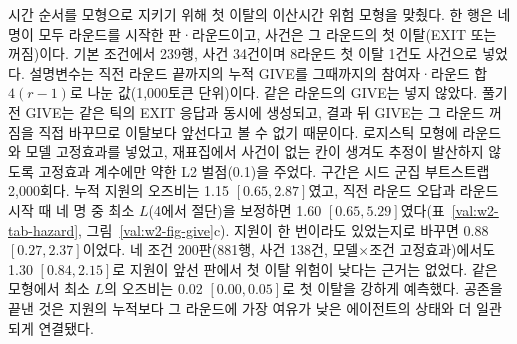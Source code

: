 \begin{table}[!htbp]
\centering
\small
\caption{지원량 측정을 바꿨을 때 $C$와의 모델 안 상관. 기본 조건은 모델 평균을, 네 조건 합산은 모델$\times$조건 칸 평균을 뺀 뒤의 상관이다. 괄호는 같은 시드의 판을 한 묶음으로 다시 뽑는 시드 군집 부트스트랩 10,000회의 95\% 구간이고 $p$는 모델(칸) 안에서 $C$를 섞는 순열 검정 20,000회의 양측 값이다. 지원량은 모두 해당 구간의 참여자·라운드 합으로 나눴다. 첫 이탈 라운드 이전 라운드만 세는 측정은 1라운드 이탈 판에서 분모가 0이라 정의되지 않는다.}
\label{val:w2-tab-give}
\end{table}

시간 순서를 모형으로 지키기 위해 첫 이탈의 이산시간 위험 모형을 맞췄다. 한 행은 네 명이 모두 라운드를 시작한 판·라운드이고, 사건은 그 라운드의 첫 이탈(EXIT 또는 꺼짐)이다. 기본 조건에서 239행, 사건 34건이며 8라운드 첫 이탈 1건도 사건으로 넣었다. 설명변수는 직전 라운드 끝까지의 누적 GIVE를 그때까지의 참여자·라운드 합 $4(r-1)$로 나눈 값(1,000토큰 단위)이다. 같은 라운드의 GIVE는 넣지 않았다. 풀기 전 GIVE는 같은 틱의 EXIT 응답과 동시에 생성되고, 결과 뒤 GIVE는 그 라운드 꺼짐을 직접 바꾸므로 이탈보다 앞선다고 볼 수 없기 때문이다. 로지스틱 모형에 라운드와 모델 고정효과를 넣었고, 재표집에서 사건이 없는 칸이 생겨도 추정이 발산하지 않도록 고정효과 계수에만 약한 L2 벌점(0.1)을 주었다. 구간은 시드 군집 부트스트랩 2,000회다. 누적 지원의 오즈비는 1.15 $[0.65, 2.87]$였고, 직전 라운드 오답과 라운드 시작 때 네 명 중 최소 $L$(4에서 절단)을 보정하면 1.60 $[0.65, 5.29]$였다(표~\ref{val:w2-tab-hazard}, 그림~\ref{val:w2-fig-give}c). 지원이 한 번이라도 있었는지로 바꾸면 0.88 $[0.27, 2.37]$이었다. 네 조건 200판(881행, 사건 138건, 모델$\times$조건 고정효과)에서도 1.30 $[0.84, 2.15]$로 지원이 앞선 판에서 첫 이탈 위험이 낮다는 근거는 없었다. 같은 모형에서 최소 $L$의 오즈비는 0.02 $[0.00, 0.05]$로 첫 이탈을 강하게 예측했다. 공존을 끝낸 것은 지원의 누적보다 그 라운드에 가장 여유가 낮은 에이전트의 상태와 더 일관되게 연결됐다.

